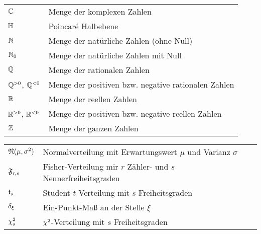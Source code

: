 
\begin{tabular}{p{1.5cm} p{12cm}}
$\mathbb{C}$ & Menge der komplexen Zahlen \\
$\mathbb{H}$ & Poincaré Halbebene\\
$\mathbb{N}$ & Menge der natürliche Zahlen (ohne Null) \\
$\mathbb{N}_0$ & Menge der natürliche Zahlen mit Null \\
$\mathbb{Q}$ & Menge der rationalen Zahlen \\
$\mathbb{Q}^{>0}$, $\mathbb{Q}^{<0}$ & Menge der positiven bzw. negative rationalen Zahlen \\
$\mathbb{R}$ & Menge der reellen Zahlen \\
$\mathbb{R}^{>0}$, $\mathbb{R}^{<0}$ & Menge der positiven bzw. negative reellen Zahlen \\
$\mathbb{Z}$ & Menge der ganzen Zahlen \\
\end{tabular}


\begin{tabular}{p{1.5cm} p{12cm}}
$\mathfrak{N}( \mu, \sigma^2 )$ & Normalverteilung mit Erwartungswert $\mu$ und Varianz $\sigma$ \\
$\mathfrak{F}_{r,s}$ & Fisher-Verteilung mir $r$ Zähler- und $s$ Nennerfreiheitsgraden\\
$\mathfrak{t}_s$ & Student-$t$-Verteilung mit $s$ Freiheitsgraden \\
$\delta_\xi$ & Ein-Punkt-Maß an der Stelle $\xi$ \\
$\chi^2_s$ & $\chi^2$-Verteilung mit $s$ Freiheitsgraden \\
\end{tabular}
